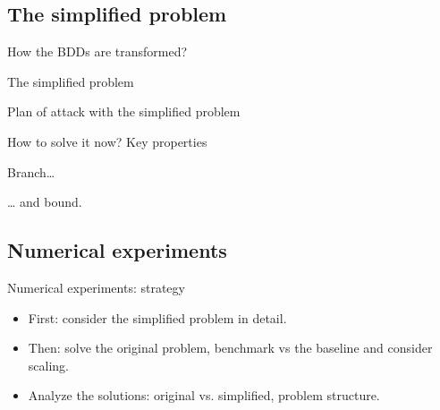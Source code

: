 \documentclass[10pt, xcolor=svgnames]{beamer}
\begin{document}
\subsection{The simplified problem}
\label{sec:org8e8be28}
\begin{frame}[label={sec:org0bdb032}]{How the BDDs are transformed?}
\end{frame}
\begin{frame}[label={sec:org2822e2c}]{The simplified problem}
\end{frame}
\begin{frame}[label={sec:orgf09fe1d}]{Plan of attack with the simplified problem}
\end{frame}
\begin{frame}[label={sec:org8d50c31}]{How to solve it now? Key properties}
\end{frame}
\begin{frame}[label={sec:org467ae60}]{Branch\ldots{}}
\end{frame}
\begin{frame}[label={sec:org82dba8f}]{\ldots{} and bound.}
\end{frame}
\subsection{Numerical experiments}
\label{sec:org345e588}
\begin{frame}[label={sec:org9d133b2}]{Numerical experiments: strategy}
\begin{itemize}
\item First: consider the simplified problem in detail.
\item Then: solve the original problem, benchmark vs the baseline and consider scaling.
\item Analyze the solutions: original vs. simplified, problem structure.
\end{itemize}
\end{frame}
\end{document}
